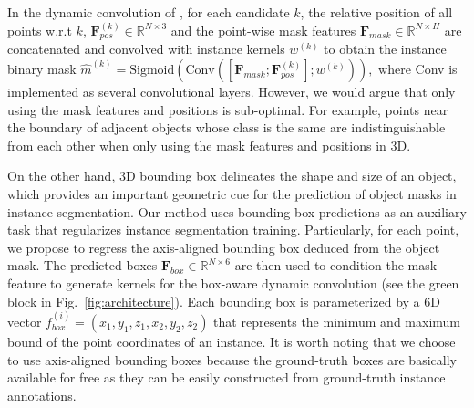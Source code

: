 \documentclass[10pt,twocolumn,letterpaper]{article}
\begin{document}
In the dynamic convolution of \cite{he2021dyco3d,He2022PointInst3DS3,wu2022dknet}, for each candidate $k$, the relative position of all points w.r.t $k$, $\mathbf{F}_{pos}^{(k)} \in \mathbb{R}^{N \times 3}$ and the point-wise mask features $\mathbf{F}_{mask} \in \mathbb{R}^{N \times H}$
are concatenated and convolved with instance kernels $w^{(k)}$ to obtain the instance binary mask $
    \widehat{m}^{(k)} = \text{Sigmoid}\left(\text{Conv} \left( \left[\mathbf{F}_{mask}; \mathbf{F}_{pos}^{(k)}\right]; w^{(k)} \right)\right),
$
where Conv is implemented as several convolutional layers. However, we would argue that only using the mask features and positions is sub-optimal. For example, points near the boundary of adjacent objects whose class is the same are indistinguishable from each other when only using the mask features and positions in 3D.
% 

On the other hand, 3D bounding box delineates the shape and size of an object, which provides an important geometric cue for the prediction of object masks in instance segmentation. 
Our method uses bounding box predictions as an auxiliary task that regularizes instance segmentation training. 
Particularly, for each point, we propose to regress the axis-aligned bounding box deduced from the object mask. 
The predicted boxes $\mathbf{F}_{box} \in \mathbb{R}^{N \times 6} $ are then used to condition the mask feature to generate kernels for the box-aware dynamic convolution (see the green block in Fig.~\ref{fig:architecture}).
Each bounding box is parameterized by a 6D vector $f_{box}^{(i)}=(x_1,y_1,z_1,x_2,y_2,z_2)$ that represents the minimum and maximum bound of the point coordinates of an instance. It is worth noting that we choose to use axis-aligned bounding boxes because the ground-truth boxes are basically available for free as they can be easily constructed from ground-truth instance annotations. 
\end{document}
